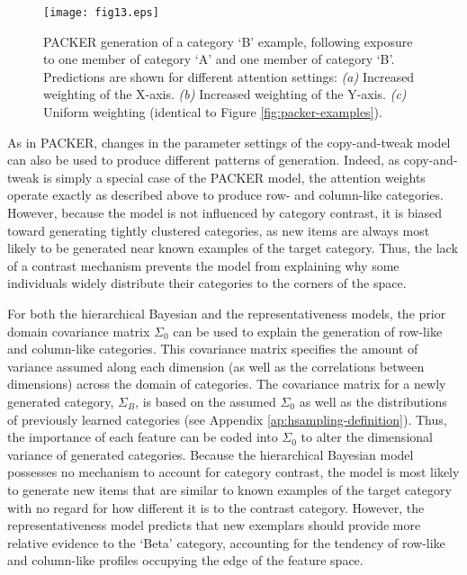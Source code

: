\documentclass[pdflatex,sn-apa]{sn-jnl}%
\theoremstyle{thmstyleone}%
\theoremstyle{thmstyletwo}%
\theoremstyle{thmstylethree}%
\begin{document}
\begin{figure}
    \begin{center} \texttt{[image: fig13.eps]}
    \caption{PACKER generation of a category `B' example, following exposure to
one member of category `A' and one member of category `B'. Predictions are shown
for different attention settings: {\em (a)} Increased weighting of the X-axis.
{\em (b)} Increased weighting of the Y-axis. {\em (c)} Uniform weighting
(identical to Figure \ref{fig:packer-examples}).}
    \label{fig:packer-attention}
    \end{center}
\end{figure}

As in PACKER, changes in the parameter settings of the copy-and-tweak model can
also be used to produce different patterns of generation. Indeed, as
copy-and-tweak is simply a special case of the PACKER model, the attention
weights operate exactly as described above to produce row- and column-like
categories. However, because the model is not influenced by category contrast,
it is biased toward generating tightly clustered categories, as new items are
always most likely to be generated near known examples of the target category.
Thus, the lack of a contrast mechanism prevents the model from explaining why
some individuals widely distribute their categories to the corners of the space.

For both the hierarchical Bayesian and the representativeness models, the prior
domain covariance matrix $\Sigma_0$ can be used to explain the generation of
row-like and column-like categories. This covariance matrix specifies the amount
of variance assumed along each dimension (as well as the correlations between dimensions) across the domain of categories. The covariance matrix for a newly
generated category, $\Sigma_B$, is based on the assumed $\Sigma_0$ as well as
the distributions of previously learned categories (see Appendix
\ref{ap:hsampling-definition}). Thus, the importance of each feature can be
coded into $\Sigma_0$ to alter the dimensional variance of generated categories.
Because the hierarchical Bayesian model possesses no mechanism to account for
category contrast, the model is most likely to generate new items that are
similar to known examples of the target category with no regard for how
different it is to the contrast category. However, the representativeness model
predicts that new exemplars should provide more relative evidence to the `Beta'
category, accounting for the tendency of row-like and column-like profiles
occupying the edge of the feature space.
\end{document}
